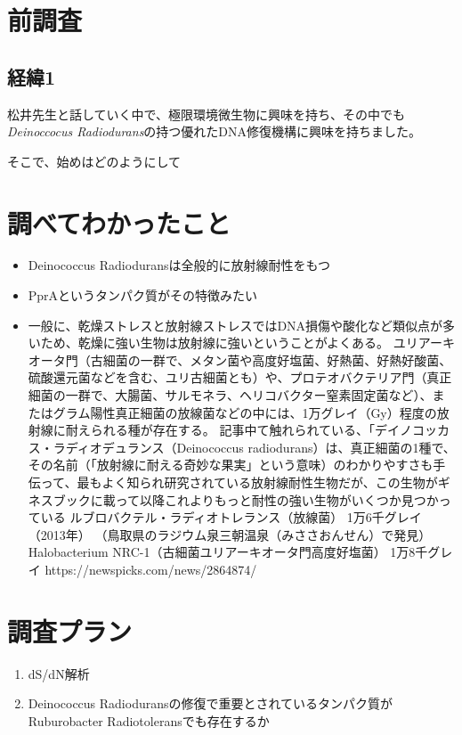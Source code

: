 \documentclass[a4j,12pt]{jreport}
\begin{document}
\section{前調査}
    \subsection{経緯1}
        松井先生と話していく中で、極限環境微生物に興味を持ち、その中でも{\it Deinoccocus Radiodurans}の持つ優れたDNA修復機構に興味を持ちました。

        そこで、始めはどのようにして
 
    \section{調べてわかったこと}
        \begin{itemize}
            \item Deinococcus Radioduransは全般的に放射線耐性をもつ
            \item PprAというタンパク質がその特徴みたい
            \item 一般に、乾燥ストレスと放射線ストレスではDNA損傷や酸化など類似点が多いため、乾燥に強い生物は放射線に強いということがよくある。
            ユリアーキオータ門（古細菌の一群で、メタン菌や高度好塩菌、好熱菌、好熱好酸菌、硫酸還元菌などを含む、ユリ古細菌とも）や、プロテオバクテリア門（真正細菌の一群で、大腸菌、サルモネラ、ヘリコバクター窒素固定菌など）、またはグラム陽性真正細菌の放線菌などの中には、1万グレイ（Gy）程度の放射線に耐えられる種が存在する。
            記事中て触れられている、「デイノコッカス・ラディオデュランス（Deinococcus radiodurans）は、真正細菌の1種で、その名前（「放射線に耐える奇妙な果実」という意味）のわかりやすさも手伝って、最もよく知られ研究されている放射線耐性生物だが、この生物がギネスブックに載って以降これよりもっと耐性の強い生物がいくつか見つかっている
            ルブロバクテル・ラディオトレランス（放線菌）
            1万6千グレイ（2013年）
            （鳥取県のラジウム泉三朝温泉（みささおんせん）で発見）
            Halobacterium NRC-1（古細菌ユリアーキオータ門高度好塩菌）
            1万8千グレイ
            https://newspicks.com/news/2864874/

        \end{itemize}


\section{調査プラン}
    \begin{enumerate}
       \item dS/dN解析 
       \item Deinococcus Radioduransの修復で重要とされているタンパク質がRuburobacter Radiotoleransでも存在するか
    \end{enumerate}
\end{document}
